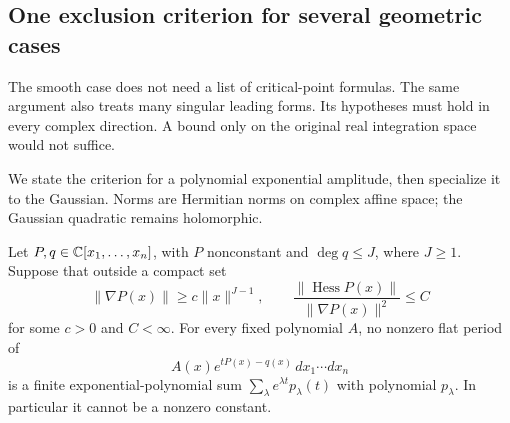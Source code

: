 \subsection{One exclusion criterion for several geometric cases}
\label{sec:gradientexclusion}

The smooth case does not need a list of critical-point formulas.
The same argument also treats many singular leading forms. Its
hypotheses must hold in every complex direction. A bound only on
the original real integration space would not suffice.

We state the criterion for a polynomial exponential amplitude, then
specialize it to the Gaussian. Norms are Hermitian norms on complex
affine space; the Gaussian quadratic remains holomorphic.

\begin{theorem}\label{thm:gradientcriterion}
Let $P,q\in\mathbb C[x_1,\ldots,x_n]$, with $P$ nonconstant and
$\deg q\leq J$, where $J\geq1$. Suppose that outside a compact set
\begin{equation}\label{eq:gradientconditions}
 \|\nabla P(x)\|\geq c\|x\|^{J-1},\qquad
 \frac{\|\operatorname{Hess}P(x)\|}{\|\nabla P(x)\|^2}\leq C
\end{equation}
for some $c>0$ and $C<\infty$. For every fixed polynomial $A$,
no nonzero flat period of
\[
 A(x)e^{tP(x)-q(x)}\,dx_1\cdots dx_n
\]
is a finite exponential-polynomial sum
$\sum_\lambda e^{\lambda t}p_\lambda(t)$ with polynomial
$p_\lambda$. In particular it cannot be a nonzero constant.
\end{theorem}

